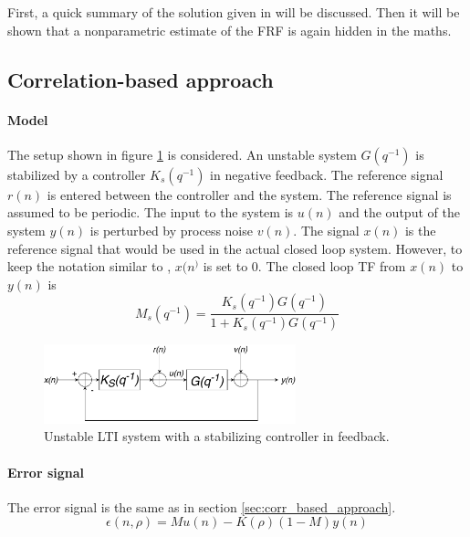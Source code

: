 First, a quick summary of the solution given in \cite{Data-driven_model_reference_control} will be discussed. Then it will be shown that a nonparametric estimate of the FRF is again hidden in the maths.

\subsection{Correlation-based approach}
\paragraph{Model}
The setup shown in figure \ref{fig:unstable_system} is considered. An unstable system $G(q^{-1})$ is stabilized by a controller $K_s(q^{-1})$ in negative feedback. The reference signal $r(n)$ is entered between the controller and the system. The reference signal is assumed to be periodic. The input to the system is $u(n)$ and the output of the system $y(n)$ is perturbed by process noise $v(n)$. The signal $x(n)$ is the reference signal that would be used in the actual closed loop system. However, to keep the notation similar to \cite{Data-driven_model_reference_control}, $x(n^)$ is set to 0. The closed loop TF from $x(n)$ to $y(n)$ is
\begin{equation*}
    M_s(q^{-1}) = \frac{K_s(q^{-1}) G(q^{-1})}{1 + K_s(q^{-1}) G(q^{-1})}
\end{equation*}

\begin{figure}[H]
    \centering
    \includegraphics[width = 0.65\textwidth]{figures/unstable_system.pdf}
    \caption{Unstable LTI system with a stabilizing controller in feedback.}
    \label{fig:unstable_system}
\end{figure}

\paragraph{Error signal} The error signal is the same as in section \ref{sec:corr_based_approach}.
\begin{equation*}
    \epsilon(n,\rho) = M u(n) - K(\rho) (1 - M) y(n)
\end{equation*}


